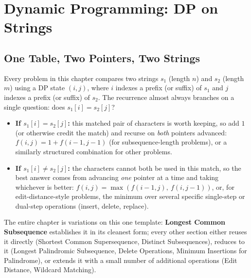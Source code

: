 \chapter{Dynamic Programming: DP on Strings}

\section{One Table, Two Pointers, Two Strings}
\label{sec:dp-strings-intro}

Every problem in this chapter compares two strings $s_1$ (length $n$)
and $s_2$ (length $m$) using a DP state $(i, j)$, where $i$ indexes a
prefix (or suffix) of $s_1$ and $j$ indexes a prefix (or suffix) of
$s_2$. The recurrence almost always branches on a single question: does
$s_1[i] = s_2[j]$?

\begin{patternbox}
\begin{itemize}
  \item \textbf{If $s_1[i] = s_2[j]$:} this matched pair of characters
        is worth keeping, so add $1$ (or otherwise credit the match) and
        recurse on \emph{both} pointers advanced:
        $f(i,j) = 1 + f(i{-}1,j{-}1)$ (for subsequence-length problems),
        or a similarly structured combination for other problems.
  \item \textbf{If $s_1[i] \ne s_2[j]$:} the characters cannot both be
        used in this match, so the best answer comes from advancing
        \emph{one} pointer at a time and taking whichever is better:
        $f(i,j) = \max(f(i{-}1,j),\ f(i,j{-}1))$, or, for edit-distance-style
        problems, the minimum over several specific single-step or
        dual-step operations (insert, delete, replace).
\end{itemize}
The entire chapter is variations on this one template: \textbf{Longest
Common Subsequence} establishes it in its cleanest form; every other
section either reuses it directly (Shortest Common Supersequence,
Distinct Subsequences), reduces to it (Longest Palindromic Subsequence,
Delete Operations, Minimum Insertions for Palindrome), or extends it with
a small number of additional operations (Edit Distance, Wildcard
Matching).
\end{patternbox}

